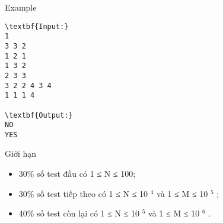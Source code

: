 Example
\begin{verbatim}
\textbf{Input:}
1
3 3 2
1 2 1
1 3 2
2 3 3
3 2 2 4 3 4
1 1 1 4

\textbf{Output:}
NO
YES\end{verbatim}
Giới hạn
\begin{itemize}
	\item 30\% số test đầu có 1 ≤ N ≤ 100;
	\item 30\% số test tiếp theo có 1 ≤ N ≤ 10 $^ 4 $ và 1 ≤ M ≤ 10 $^ 5 $ ;
	\item 40\% số test còn lại có 1 ≤ N ≤ 10 $^ 5 $ và 1 ≤ M ≤ 10 $^ 6 $ .
\end{itemize}